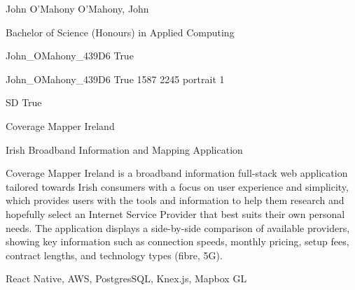 \documentclass[twoside]{report}
\begin{document}
\begingroup{}\relax



\def\Key{John_OMahony_439D6}

{John O'Mahony}
{O'Mahony, John}

{Bachelor of Science (Honours) in Applied Computing}

{John_OMahony_439D6}
{True}

{John_OMahony_439D6}
{True}
{1587}
{2245}
{portrait}
{1}

{SD}
{True}

{Coverage Mapper Ireland}

{Irish Broadband Information and Mapping Application}

{Coverage Mapper Ireland is a broadband information full-stack web application tailored towards Irish consumers with a focus on user experience and simplicity, which provides users with the tools and information to help them research and hopefully select an Internet Service Provider that best suits their own personal needs. The application displays a side-by-side comparison of available providers, showing key information such as connection speeds, monthly pricing, setup fees, contract lengths, and technology types (fibre, 5G).}

{React Native, AWS, PostgresSQL, Knex.js, Mapbox GL}
\end{document}
